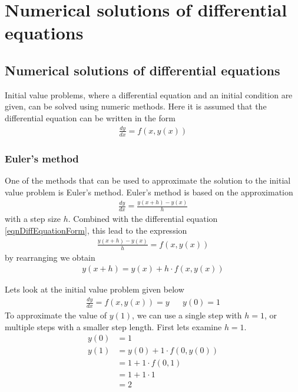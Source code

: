 \section{Numerical solutions of differential equations}





\subsection{Numerical solutions of differential equations}

Initial value problems, where a differential equation and 
an initial condition are given, can be solved using numeric methods.
Here it is assumed that the differential equation can be 
written in the form
\begin{align}
\label{eqnDiffEquationForm}
\frac{dy}{dx} = f(x, y(x))
\end{align}

\subsubsection{Euler's method}
One of the methods that can be used to approximate the solution
to the initial value problem is Euler's method.
Euler's method is based on the approximation
\begin{align*}
\frac{dy}{dx} = \frac{y(x + h) - y(x)}{h}
\end{align*}
with a step size $h$.
Combined with the differential equation
\eqref{eqnDiffEquationForm}, this lead to the expression
\begin{align*}
\frac{y(x + h) - y(x)}{h} = f(x, y(x))
\end{align*}
by rearranging we obtain
\begin{align*}
y(x + h) = y(x) + h \cdot f(x, y(x))
\end{align*}

Lets look at the initial value problem given below
\begin{align*}
\frac{dy}{dx} = f(x, y(x)) = y	&& y(0) = 1
\end{align*}
To approximate the value of $y(1)$, we can use a single
step with $h = 1$, or multiple steps with a smaller step
length.
First lets examine $h = 1$.
\begin{align*}
y(0) & = 1 \\
y(1) & = y(0) + 1 \cdot f(0, y(0)) \\
& = 1 + 1 \cdot f(0, 1) \\
& = 1 + 1 \cdot 1 \\
& = 2
\end{align*}

